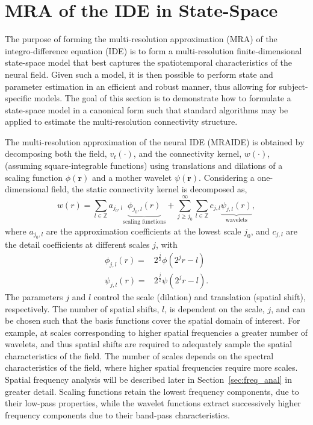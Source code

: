 \documentclass[review,authoryear,3p]{elsarticle}
\begin{document}
\section{MRA of the IDE in State-Space}
The purpose of forming the multi-resolution approximation (MRA) of the integro-difference equation (IDE) is to form a multi-resolution finite-dimensional state-space model that best captures the spatiotemporal characteristics of the neural field. Given such a model, it is then possible to perform state and parameter estimation in an efficient and robust manner, thus allowing for subject-specific models. The goal of this section is to demonstrate how to formulate a state-space model in a canonical form such that standard algorithms may be applied to estimate the multi-resolution connectivity structure.   

The multi-resolution approximation \citep{Mallat1989a} of the neural IDE (MRAIDE) is obtained by decomposing both the field, $v_t(\cdot)$, and the connectivity kernel, $w(\cdot)$, (assuming square-integrable functions) using translations and dilations of a scaling function $\phi(\mathbf{r})$ and a mother wavelet $\psi(\mathbf{r})$. Considering a  one-dimensional field, the static connectivity kernel is decomposed as,
\begin{equation}
 w\left(r\right)=\sum_{l\in \mathbb{Z}}a_{j_0,l} \underbrace{\phi_{j_0,l}\left(r\right)}_{\text{scaling functions}} + \sum_{j\geq j_0}^{\infty} \sum_{l \in \mathbb{Z}}c_{j,l} \underbrace{\psi_{j,l}\left(r\right)}_{\text{wavelets}}, 
\label{eq:KernelExpansion}
\end{equation}
where $a_{j_0,l}$ are the approximation coefficients at the lowest scale $j_0$, and $c_{j,l}$ are the detail coefficients at different scales $j$, with
\begin{align}
\phi_{j,l}\left(r\right) =& 2^{\frac{j}{2}}\phi\left(2^j r-l\right) \label{eq:generalscalingfinction}\\	
\psi_{j,l}\left(r\right) =& 2^{\frac{j}{2}}\psi\left(2^j r-l\right).  \label{eq:generalwaveletfinction}
\end{align}
The parameters $j$ and $l$ control the scale (dilation) and translation (spatial shift), respectively. The number of spatial shifts, $l$, is dependent on the scale, $j$, and can be chosen such that the basis functions cover the spatial domain of interest. For example, at scales corresponding to higher spatial frequencies a greater number of wavelets, and thus spatial shifts are required to adequately sample the spatial characteristics of the field. The number of scales depends on the spectral characteristics of the field, where higher spatial frequencies require  more scales. Spatial frequency analysis will be described later in Section~\ref{sec:freq_anal} in greater detail. Scaling functions retain the lowest frequency components, due to their low-pass properties, while the wavelet functions extract successively higher frequency components due to their band-pass characteristics. 
\end{document}
